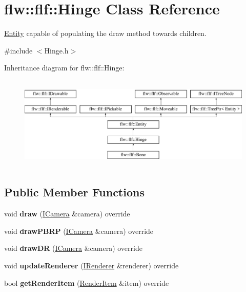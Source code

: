 \hypertarget{classflw_1_1flf_1_1Hinge}{}\section{flw\+:\+:flf\+:\+:Hinge Class Reference}
\label{classflw_1_1flf_1_1Hinge}


\hyperlink{classflw_1_1flf_1_1Entity}{Entity} capable of populating the draw method towards children.  




{\ttfamily \#include $<$Hinge.\+h$>$}

Inheritance diagram for flw\+:\+:flf\+:\+:Hinge\+:\begin{figure}[H]
\begin{center}
\leavevmode
\includegraphics[height=4.487180cm]{classflw_1_1flf_1_1Hinge}
\end{center}
\end{figure}
\subsection*{Public Member Functions}
\begin{DoxyCompactItemize}
\item 
\mbox{\label{classflw_1_1flf_1_1Hinge_a7eaaa5d2d2a1e2f3c6c6500031d0cab6}} 
void {\bfseries draw} (\hyperlink{classflw_1_1flf_1_1ICamera}{I\+Camera} \&camera) override
\item 
\mbox{\label{classflw_1_1flf_1_1Hinge_ac9aed70e3fbed2d4e2bb40b1248f2955}} 
void {\bfseries draw\+P\+B\+RP} (\hyperlink{classflw_1_1flf_1_1ICamera}{I\+Camera} \&camera) override
\item 
\mbox{\label{classflw_1_1flf_1_1Hinge_a4e7c9e2e2cd5a3f9a5fbd1d9b24c13c0}} 
void {\bfseries draw\+DR} (\hyperlink{classflw_1_1flf_1_1ICamera}{I\+Camera} \&camera) override
\item 
\mbox{\label{classflw_1_1flf_1_1Hinge_a6c71b26eba2726415d89f281de5be6d1}} 
void {\bfseries update\+Renderer} (\hyperlink{classflw_1_1flf_1_1IRenderer}{I\+Renderer} \&renderer) override
\item 
\mbox{\label{classflw_1_1flf_1_1Hinge_a6cc851b6a7ce956c6a16ec4fe1f30585}} 
bool {\bfseries get\+Render\+Item} (\hyperlink{structflw_1_1flf_1_1RenderItem}{Render\+Item} \&item) override
\end{DoxyCompactItemize}
